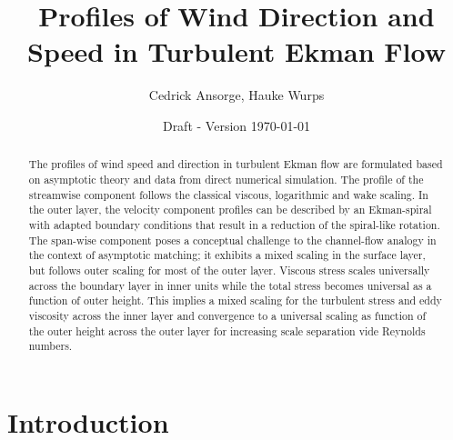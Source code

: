 \documentclass[a4paper,11pt]{amsart}
\date{\scriptsize Draft - Version \today}
\title{Profiles of Wind Direction and Speed in Turbulent Ekman Flow}
\author{Cedrick Ansorge, Hauke Wurps}
\begin{document}
 

\maketitle

\begin{abstract}
  The profiles of wind speed and direction in turbulent Ekman flow
  are formulated based on asymptotic theory and data from direct numerical simulation. 
  The profile of the streamwise component follows the classical viscous, logarithmic and wake scaling.
  In the outer layer, the velocity component profiles can be described by an Ekman-spiral with adapted
  boundary conditions that result in a reduction of the spiral-like rotation. 
  The span-wise component poses a conceptual challenge to the channel-flow analogy
  in the context of asymptotic matching; it exhibits a mixed scaling in the surface layer, but follows
  outer scaling for most of the outer layer.
  Viscous stress scales universally across the boundary layer in inner units while the total stress
  becomes universal as a function of outer height.
  This implies a mixed scaling for the turbulent stress and eddy viscosity across the inner layer
  and convergence to a universal scaling as function of the outer height across the outer layer
  for increasing scale separation vide Reynolds numbers. 
\end{abstract}
%
%
\section{Introduction}
\end{document}
